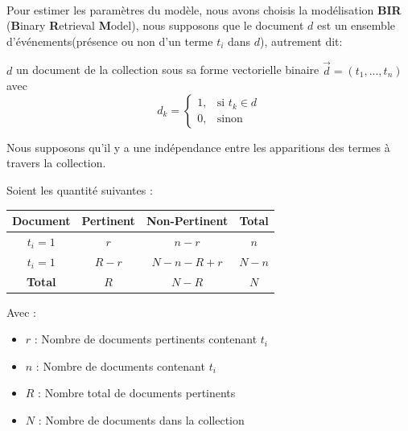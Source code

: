 \documentclass[12pt]{report}
\begin{document}
			\paragraph{}
			Pour estimer les paramètres du modèle, nous avons choisis la modélisation \textbf{BIR}
			(\textbf{B}inary \textbf{R}etrieval \textbf{M}odel), nous supposons que le document $d$
			est un ensemble d'événements(présence ou non d'un terme $t_i$ dans $d$), autrement dit:\par 
			$d$ un document de la collection sous sa forme vectorielle binaire $\vec{d} = (t_1,...,t_n)$ avec 
			\[
			d_k = 
			\begin{cases}
			1,&\text{si } t_k \in d\\
			0,& \text{sinon}
			\end{cases}
			\]
			\par
			Nous supposons qu'il y a une indépendance entre les apparitions des termes à travers
			la collection.
			\par
			Soient les quantité suivantes : 
			\begin{table}[H]
				\centering
				\begin{tabular}{|c|c|c|c|}
					\hline
					\rowcolor[HTML]{EFEFEF} 
					\textbf{Document} & \textbf{Pertinent} & \textbf{Non-Pertinent} & \textbf{Total} \\ \hline
					$t_i=1$           & $r$                & $n-r$                  & $n$            \\ \hline
					$t_i=1$           & $R-r$              & $N-n-R+r$              & $N-n$          \\ \hline
					\textbf{Total}    & $R$                & $N-R$                  & $N$            \\ \hline
				\end{tabular}
			\end{table}
			Avec :
			\begin{itemize}
				\item $r$ : Nombre de documents pertinents contenant $t_i$
				\item $n$ : Nombre de documents contenant $t_i$
				\item $R$ : Nombre total de documents pertinents
				\item $N$ : Nombre de documents dans la collection
			\end{itemize}
			
\end{document}
